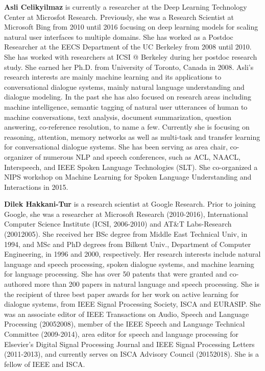  {\bfseries Asli Celikyilmaz} is currently a researcher at the Deep Learning Technology Center at Microsfot Research. Previously, she was a Research Scientist at Microsoft Bing from 2010 until 2016 focusing on deep learning models for scaling natural user interfaces to multiple domains. She has worked as a Postdoc Researcher at the EECS Department of the UC Berkeley from 2008 until 2010. She has worked with researchers at ICSI @ Berkeley during her postdoc research study. She earned her Ph.D. from University of Toronto, Canada in 2008. Asli’s research interests are mainly machine learning and its applications to conversational dialogue systems, mainly natural language understanding and dialogue modeling. In the past she has also focused on research areas including machine intelligence, semantic tagging of natural user utterances of human to machine conversations, text analysis, document summarization, question answering, co-reference resolution, to name a few. Currently she is focusing on reasoning, attention, memory networks as well as multi-task and transfer learning for conversational dialogue systems. She has been serving as area chair, co-organizer of numerous NLP and speech conferences, such as ACL, NAACL, Interspeech, and IEEE Spoken Language Technologies (SLT). She co-organized a NIPS workshop on Machine Learning for Spoken Language Understanding and Interactions in 2015.

  {\bfseries Dilek Hakkani-Tur} is a research scientist at Google Research. Prior to joining Google, she was a researcher at Microsoft Research (2010-2016), International Computer Science Institute (ICSI, 2006-2010) and AT\&T Labs-Research (20012005). She received her BSc degree from Middle East Technical Univ, in 1994, and MSc and PhD degrees from Bilkent Univ., Department of Computer Engineering, in 1996 and 2000, respectively. Her research interests include natural language and speech processing, spoken dialogue systems, and machine learning for language processing. She has over 50 patents that were granted and co-authored more than 200 papers in natural language and speech processing. She is the recipient of three best paper awards for her work on active learning for dialogue systems, from IEEE Signal Processing Society, ISCA and EURASIP. She was an associate editor of IEEE Transactions on Audio, Speech and Language Processing (20052008), member of the IEEE Speech and Language Technical Committee (2009-2014), area editor for speech and language processing for Elsevier’s Digital Signal Processing Journal and IEEE Signal Processing Letters (2011-2013), and currently serves on ISCA Advisory Council (20152018). She is a fellow of IEEE and ISCA. 
